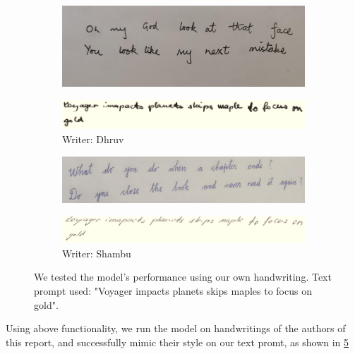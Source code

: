 \documentclass[10pt,twocolumn,letterpaper]{article}
\begin{document}
\begin{figure}[h]
  \begin{subfigure}[b]{0.45\textwidth}
    \includegraphics[width=\textwidth]{../latex-src/Images/dhruv-1.jpeg}
    \label{fig:dhruv-input}
  \end{subfigure}
  \hfill
  \vspace*{-3mm}
  \begin{subfigure}[b]{0.45\textwidth}
    \includegraphics[width=\textwidth]{../latex-src/Images/Dhruv-output.png}
    \caption{{Writer: Dhruv}}
    \label{fig:dhruv-output}
  \end{subfigure}
  \hfill
  \vspace*{3mm}

  \begin{subfigure}[b]{0.45\textwidth}
    \includegraphics[width=\textwidth]{../latex-src/Images/shambu-1.jpeg}
    \label{fig:shambu-input}
  \end{subfigure}
  \hfill
  \vspace*{-3mm}
  \begin{subfigure}[b]{0.45\textwidth}
    \includegraphics[width=\textwidth]{../latex-src/Images/Shambu-output.png}
    \caption{{Writer: Shambu}}
    \label{fig:shambu-output}
  \end{subfigure}
  \caption{{We tested the model's performance using our own handwriting. Text prompt used: "Voyager impacts planets skips maples to focus on gold".}}
  \label{fig:Writers}
\end{figure}

Using above functionality, we run the model on handwritings of the authors of this report, and successfully mimic their style on our text promt, as shown in \ref{fig:Writers} 

{\small


}
\end{document}
